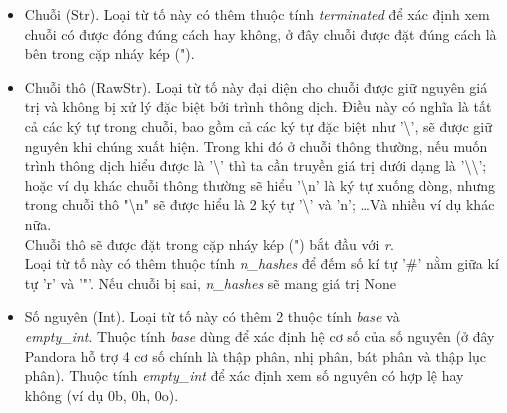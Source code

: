 \begin{itemize}
    \begin{itemize}
      \item Chuỗi (Str). Loại từ tố này có thêm thuộc tính \textit{terminated} để xác định xem chuỗi có được đóng đúng cách hay không, ở đây chuỗi được đặt đúng cách là bên trong cặp nháy kép (").
      \item Chuỗi thô (RawStr). Loại từ tố này đại diện cho chuỗi được giữ nguyên giá trị và không bị xử lý đặc biệt bởi trình thông dịch. Điều này có nghĩa là tất cả các ký tự trong chuỗi, bao gồm cả các ký tự đặc biệt như '\textbackslash', sẽ được giữ nguyên khi chúng xuất hiện. Trong khi đó ở chuỗi thông thường, nếu muốn trình thông dịch hiểu được là '\textbackslash' thì ta cần truyền giá trị dưới dạng là '\textbackslash\textbackslash'; hoặc ví dụ khác chuỗi thông thường sẽ hiểu '\textbackslash n' là ký tự xuống dòng, nhưng trong chuỗi thô "\textbackslash n" sẽ được hiểu là 2 ký tự '\textbackslash' và 'n'; \dots\space Và nhiều ví dụ khác nữa. 
      \\Chuỗi thô sẽ được đặt trong cặp nháy kép (") bắt đầu với \textit{r}.
      \\Loại từ tố này có thêm thuộc tính \textit{n\_hashes} để đếm số kí tự '\#' nằm giữa kí tự 'r' và '"'. Nếu chuỗi bị sai, \textit{n\_hashes} sẽ mang giá trị None
      \item Số nguyên (Int). Loại từ tố này có thêm 2 thuộc tính \textit{base} và \\\textit{empty\_int}. Thuộc tính \textit{base} dùng để xác định hệ cơ số của số nguyên (ở đây Pandora hỗ trợ 4 cơ số chính là thập phân, nhị phân, bát phân và thập lục phân). Thuộc tính \textit{empty\_int} để xác định xem số nguyên có hợp lệ hay không (ví dụ 0b, 0h, 0o).

\end{itemize}
\end{itemize}
